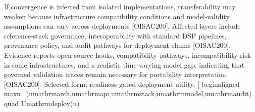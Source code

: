 {}
\markdownRendererSectionEnd \markdownRendererSectionBegin
{}\markdownRendererInterblockSeparator
{}If convergence is inferred from isolated implementations, transferability may weaken because infrastructure compatibility conditions and model-validity assumptions can vary across deployments [O\markdownRendererUnderscore{}ISAC\markdownRendererUnderscore{}200]. Affected layers include reference-stack governance, interoperability with standard DSP pipelines, provenance policy, and audit pathways for deployment claims [O\markdownRendererUnderscore{}ISAC\markdownRendererUnderscore{}200]. Evidence reports open-source hooks, compatibility pathways, incompatibility risk in some infrastructures, and a realistic time-varying model gap, indicating that governed validation traces remain necessary for portability interpretation [O\markdownRendererUnderscore{}ISAC\markdownRendererUnderscore{}200].\markdownRendererInterblockSeparator
{}
\markdownRendererSectionEnd \markdownRendererSectionBegin
{}\markdownRendererInterblockSeparator
{}Selected form: readiness-gated deployment utility.\markdownRendererParagraphSeparator
{}[\markdownRendererSoftLineBreak
{}\markdownRendererBackslash{}begin\markdownRendererLeftBrace{}aligned\markdownRendererRightBrace{}\markdownRendererSoftLineBreak
{}\markdownRendererBackslash{}max\markdownRendererUnderscore{}\markdownRendererLeftBrace{}u=(u\markdownRendererUnderscore{}\markdownRendererLeftBrace{}\markdownRendererBackslash{}mathrm\markdownRendererLeftBrace{}arch\markdownRendererRightBrace{}\markdownRendererRightBrace{},u\markdownRendererUnderscore{}\markdownRendererLeftBrace{}\markdownRendererBackslash{}mathrm\markdownRendererLeftBrace{}api\markdownRendererRightBrace{}\markdownRendererRightBrace{},u\markdownRendererUnderscore{}\markdownRendererLeftBrace{}\markdownRendererBackslash{}mathrm\markdownRendererLeftBrace{}stack\markdownRendererRightBrace{}\markdownRendererRightBrace{},u\markdownRendererUnderscore{}\markdownRendererLeftBrace{}\markdownRendererBackslash{}mathrm\markdownRendererLeftBrace{}model\markdownRendererRightBrace{}\markdownRendererRightBrace{},u\markdownRendererUnderscore{}\markdownRendererLeftBrace{}\markdownRendererBackslash{}mathrm\markdownRendererLeftBrace{}audit\markdownRendererRightBrace{}\markdownRendererRightBrace{})\markdownRendererRightBrace{} \markdownRendererBackslash{}quad \markdownRendererAmpersand{} U\markdownRendererUnderscore{}\markdownRendererLeftBrace{}\markdownRendererBackslash{}mathrm\markdownRendererLeftBrace{}deploy\markdownRendererRightBrace{}\markdownRendererRightBrace{}(u) \markdownRendererBackslash{}\markdownRendererSoftLineBreak
